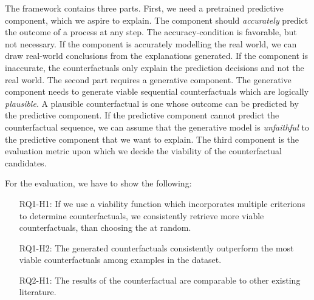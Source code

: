 \documentclass[./../../paper.tex]{subfiles}
\begin{document}
\noindent The framework contains three parts. First, we need a pretrained predictive component, which we aspire to explain. The component should \emph{accurately} predict the outcome of a process at any step. The accuracy-condition is favorable, but not necessary. If the component is accurately modelling the real world, we can draw real-world conclusions from the explanations generated. If the component is inaccurate, the counterfactuals only explain the prediction decisions and not the real world. The second part requires a generative component. The generative component needs to generate viable sequential counterfactuals which are logically \emph{plausible}. A plausible counterfactual is one whose outcome can be  predicted by the predictive component. If the predictive component cannot predict the counterfactual sequence, we can assume that the generative model is \emph{unfaithful} to the predictive component that we want to explain. The third component is the evaluation metric upon which we decide the viability of the counterfactual candidates.

For the evaluation, we have to show the following:
\begin{itemize}
    \item[RQ1-H1:] If we use a viability function which incorporates multiple criterions to determine counterfactuals, we consistently retrieve more viable counterfactuals, than choosing the at random.
    \item[RQ1-H2:] The generated counterfactuals consistently outperform the most viable counterfactuals among examples in the dataset.
    \item[RQ2-H1:] The results of the counterfactual are comparable to other existing literature.
\end{itemize}
\end{document}
